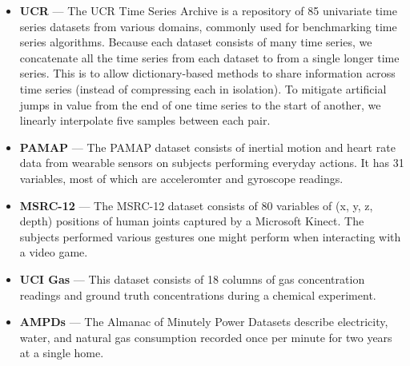 \begin{itemize}[leftmargin=4mm]
\item \textbf{UCR} \cite{ucrTimeSeries} --- The UCR Time Series Archive is a repository of 85 univariate time series datasets from various domains, commonly used for benchmarking time series algorithms. Because each dataset consists of many time series, we concatenate all the time series from each dataset to from a single longer time series. This is to allow dictionary-based methods to share information across time series (instead of compressing each in isolation). To mitigate artificial jumps in value from the end of one time series to the start of another, we linearly interpolate five samples between each pair.
\item \textbf{PAMAP} \cite{pamap} --- The PAMAP dataset consists of inertial motion and heart rate data from wearable sensors on subjects performing everyday actions. It has 31 variables, most of which are acceleromter and gyroscope readings.
\item \textbf{MSRC-12} \cite{msrc} --- The MSRC-12 dataset consists of 80 variables of (x, y, z, depth) positions of human joints captured by a Microsoft Kinect. The subjects performed various gestures one might perform when interacting with a video game.
\item \textbf{UCI Gas} \cite{uci_gas} --- This dataset consists of 18 columns of gas concentration readings and ground truth concentrations during a chemical experiment.
\item \textbf{AMPDs} \cite{ampds} --- The Almanac of Minutely Power Datasets describe electricity, water, and natural gas consumption recorded once per minute for two years at a single home. %
\end{itemize}

